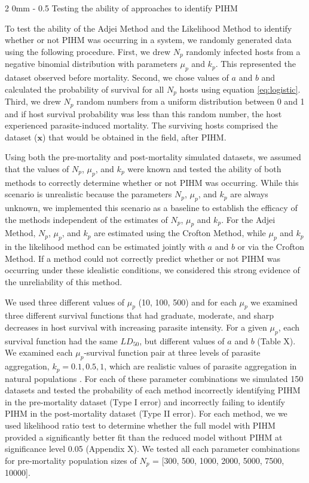 \documentclass[12pt, a4paper]{article}
\makeatletter
\renewcommand{\subsection}{\@startsection
{subsection}%
{2}%
{0mm}%
{-\baselineskip}%
{0.5\baselineskip}%
{\normalfont\bf}} %
\makeatother
\begin{document}
\subsection{Testing the ability of approaches to identify PIHM}

To test the ability of the Adjei Method and the Likelihood Method to identify whether or not PIHM was occurring in a system, we randomly generated data using the following procedure.  First, we drew $N_p$ randomly infected hosts from a
negative binomial distribution with parameters $\mu_p$ and $k_p$.  This represented the dataset observed before mortality. Second, we chose values of $a$ and $b$ and calculated the probability of survival
for all $N_p$ hosts using equation \ref{eq:logistic}.  Third, we drew $N_p$ random numbers from a uniform distribution
between 0 and 1 and if host survival probability was less than this random
number, the host experienced parasite-induced mortality.  The surviving
hosts comprised the dataset ($\mathbf{x}$) that would be obtained in the field, after PIHM.

Using both the pre-mortality and post-mortality simulated datasets,  we assumed
that the values of $N_p$, $\mu_p$, and $k_p$ were known and tested the ability of both methods to correctly determine whether or not PIHM was occurring.  While this scenario is unrealistic because the parameters $N_p$,
$\mu_p$, and $k_p$ are always unknown, we implemented this scenario as a baseline to
establish the efficacy of the methods independent of the estimates of $N_p$, $\mu_p$ and $k_p$.  For the Adjei Method, $N_p$, $\mu_p$, and $k_p$ are estimated using the Crofton Method, while $\mu_p$ and $k_p$ in the likelihood method can be estimated jointly with $a$ and $b$ or via the Crofton Method.   If a
method could not correctly predict whether or not PIHM was occurring under these idealistic conditions, we considered this strong evidence of the unreliability of this method.

We used three different values of $\mu_p$ (10, 100, 500) and for each $\mu_p$ we examined three different survival functions that had graduate, moderate, and sharp decreases in host survival with increasing parasite intensity.  For a given $\mu_p$, each survival function had the same $LD_{50}$, but different values of $a$ and $b$ (Table X).  We examined each $\mu_p$-survival function pair at  three levels of parasite
aggregation, $k_p = 0.1, 0.5, 1$, which are realistic values of parasite aggregation in natural populations \citep{Shaw1998}.  For each of these parameter
combinations we simulated 150 datasets and tested the probability of each method incorrectly identifying PIHM in the pre-mortality dataset (Type I error) and incorrectly failing to identify PIHM in the post-mortality dataset (Type II error).  For each method, we we used likelihood ratio test to determine whether the full model with PIHM provided a significantly better fit than the reduced model without PIHM at significance level 0.05 (Appendix X).  We tested all each parameter combinations for pre-mortality population sizes of $N_p$ = [300, 500, 1000, 2000, 5000, 7500,
10000].
\end{document}
